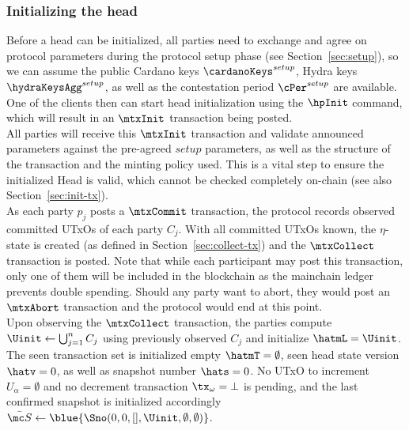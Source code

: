 \subsubsection{Initializing the head}

\quad Before a head can be initialized, all parties need
to exchange and agree on protocol parameters during the protocol setup phase
(see Section~\ref{sec:setup}), so we can assume the public Cardano keys
$\cardanoKeys^{setup}$, Hydra keys $\hydraKeysAgg^{setup}$, as well as the
contestation period $\cPer^{setup}$ are available. One of the clients then can
start head initialization using the $\hpInit$ command, which will result in an
$\mtxInit$ transaction being posted. \\

\quad All parties will receive this $\mtxInit$
transaction and validate announced parameters against the pre-agreed $setup$
parameters, as well as the structure of the transaction and the minting policy
used. This is a vital step to ensure the initialized Head is valid, which
cannot be checked completely on-chain (see also Section~\ref{sec:init-tx}). \\

\quad As each party $p_{j}$ posts a
$\mtxCommit$ transaction, the protocol records observed committed UTxOs of each
party $C_j$. With all committed UTxOs known, the $\eta$-state is created (as
defined in Section~\ref{sec:collect-tx}) and the $\mtxCollect$ transaction is
posted. Note that while each participant may post this transaction, only one of
them will be included in the blockchain as the mainchain ledger prevents double
spending. Should any party want to abort, they would post an $\mtxAbort$
transaction and the protocol would end at this point.\\

\quad Upon observing the $\mtxCollect$
transaction, the parties compute $\Uinit \gets \bigcup_{j=1}^{n} C_j$ using previously
observed $C_j$ and initialize $\hatmL = \Uinit$. The seen transaction set is
initialized empty $\hatmT = \emptyset$, seen head state version $\hatv = 0$, as well as
snapshot number $\hats = 0$. No UTxO to increment $U_{\alpha} = \emptyset$ and no
decrement transaction $\tx_{\omega} = \bot$ is pending, and the last confirmed snapshot
is initialized accordingly $\bar{\mc S} \gets \blue{\Sno(0, 0, [], \Uinit, \emptyset, \emptyset)}$.

